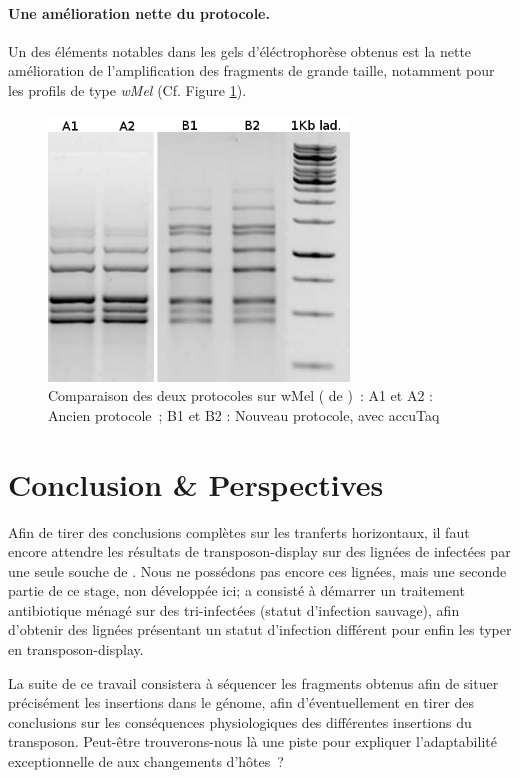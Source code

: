 \paragraph{Une amélioration nette du protocole.} %
\label{par:proto}
Un des éléments notables dans les gels d'éléctrophorèse obtenus est la nette amélioration de l'amplification des fragments de grande taille, notamment pour les profils de type \textit{wMel} (Cf. Figure \ref{fig:wMelcomp}). 
\begin{figure}[tb]
	\begin{center}
		\includegraphics[width=80mm]{images/wMel_comp.png}
	\end{center}
	\caption{Comparaison des deux protocoles sur wMel ( de )~:
	A1 et A2 : Ancien protocole\cite{memHH}~;
	B1 et B2 : Nouveau protocole, avec accuTaq}
	\label{fig:wMelcomp}
\end{figure}


\section{Conclusion \& Perspectives} %
\label{sec:ccl}
Afin de tirer des conclusions complètes sur les tranferts horizontaux, il faut encore attendre les résultats de transposon-display sur des lignées de  infectées par une seule souche de .
Nous ne possédons pas encore ces lignées, mais une seconde partie de ce stage, non développée ici; a consisté à démarrer un traitement antibiotique ménagé sur des  tri-infectées (statut d'infection sauvage), afin d'obtenir des lignées présentant un statut d'infection différent pour enfin les typer en transposon-display.

La suite de ce travail consistera à séquencer les fragments obtenus afin de situer précisément les insertions dans le génome, afin d’éventuellement en tirer des conclusions sur les conséquences physiologiques des différentes insertions du transposon. Peut-être trouverons-nous là une piste pour expliquer l’adaptabilité exceptionnelle de  aux changements d’hôtes ?
